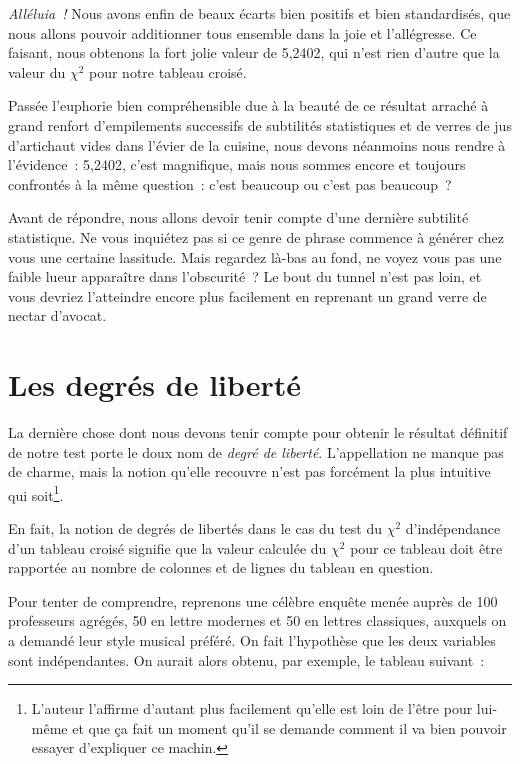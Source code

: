 \documentclass[a4paper,10pt,twoside,francais]{report}
\newcommand{\chid}{$\chi^2$\xspace}
\begin{document}
\textit{Alléluia~!} Nous avons enfin de beaux écarts bien positifs et bien
standardisés, que nous allons pouvoir additionner tous ensemble dans
la joie et l'allégresse. Ce faisant, nous obtenons la fort jolie valeur
de 5,2402, qui n'est rien d'autre que la valeur du \chid pour notre
tableau croisé.

Passée l'euphorie bien compréhensible due à la beauté de ce résultat
arraché à grand renfort d'empilements successifs de subtilités
statistiques et de verres de jus d'artichaut vides dans l'évier de la
cuisine, nous devons néanmoins nous rendre à l'évidence~: 5,2402,
c'est magnifique, mais nous sommes encore et toujours confrontés à la
même question~: c'est beaucoup ou c'est pas beaucoup~?

Avant de répondre, nous allons devoir tenir compte d'une dernière
subtilité statistique. Ne vous inquiétez pas si ce genre de phrase
commence à générer chez vous une certaine lassitude. Mais regardez
là-bas au fond, ne voyez vous pas une faible lueur apparaître dans
l'obscurité~? Le bout du tunnel n'est pas loin, et vous devriez
l'atteindre encore plus facilement en reprenant un grand verre de
nectar d'avocat.



\section{Les degrés de liberté}
\label{ssec-ddl}

La dernière chose dont nous devons tenir compte pour obtenir le
résultat définitif de notre test porte le doux nom de \textit{degré de
liberté}. L'appellation ne manque pas de charme, mais la notion
qu'elle recouvre n'est pas forcément la plus intuitive qui
soit\footnote{L'auteur l'affirme d'autant plus facilement qu'elle est
  loin de l'être pour lui-même et que ça fait un moment qu'il se
  demande comment il va bien pouvoir essayer d'expliquer ce machin.}.

En fait, la notion de degrés de libertés dans le cas du test du \chid
d'indépendance d'un tableau croisé signifie que la valeur calculée du
\chid pour ce tableau doit être rapportée au nombre de colonnes et de
lignes du tableau en question. 

Pour tenter de comprendre, reprenons une célèbre enquête menée auprès
de 100 professeurs agrégés, 50 en lettre modernes et 50 en lettres
classiques, auxquels on a demandé leur style musical préféré. On fait
l'hypothèse que les deux variables sont indépendantes. On aurait alors
obtenu, par exemple, le tableau suivant~:
\end{document}
